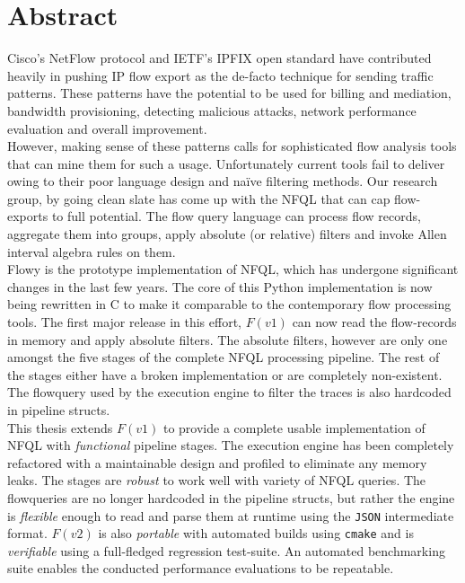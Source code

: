 \begingroup
\let\clearpage\relax
\let\cleardoublepage\relax
\let\cleardoublepage\relax
\chapter*{Abstract}

Cisco's NetFlow protocol \cite{rfc3954} and \ac{IETF}'s \ac{IPFIX}
\cite{rfc5101} open standard have contributed heavily in pushing \ac{IP} flow
export as the de-facto technique for sending traffic patterns. These patterns
have the potential to be used for billing and mediation, bandwidth
provisioning, detecting malicious attacks, network performance evaluation and
overall improvement. \\

However, making sense of these patterns calls for sophisticated flow analysis
tools that can mine them for such a usage. Unfortunately current tools fail to
deliver owing to their poor language design and na\"ive filtering methods. Our
research group, by going clean slate has come up with the \ac{NFQL}
\cite{vmarinov:thesis:2009} that can cap flow-exports to full potential.
The flow query language can process flow records, aggregate them into groups,
apply absolute (or relative) filters and invoke Allen interval algebra rules
\cite{fallen:1983} on them. \\

Flowy \cite{kkanev:thesis:2009} is the prototype implementation of \ac{NFQL},
which has undergone significant changes in the last few years.  The core of
this Python implementation is now being rewritten in C to make it comparable
to the contemporary flow processing tools. The first major release in this
effort, $F(v1)$ \cite{jschauer:thesis:2011} can now read the flow-records in
memory and apply absolute filters. The absolute filters, however are only one
amongst the five stages of the complete \ac{NFQL} processing pipeline. The
rest of the stages either have a broken implementation or are completely
non-existent. The flowquery used by the execution engine to filter the traces
is also hardcoded in pipeline structs. \\

This thesis extends $F(v1)$ to provide a complete usable implementation of
\ac{NFQL} with \emph{functional} pipeline stages. The execution engine has
been completely refactored with a maintainable design and profiled to
eliminate any memory leaks. The stages are \emph{robust} to work well with
variety of \ac{NFQL} queries. The flowqueries are no longer hardcoded in the
pipeline structs, but rather the engine is \emph{flexible} enough to read and
parse them at runtime using the \texttt{JSON} intermediate format. $F(v2)$ is
also \emph{portable} with automated builds using \texttt{cmake} and is
\emph{verifiable} using a full-fledged regression test-suite. An automated
benchmarking suite enables the conducted performance evaluations to be
repeatable.

